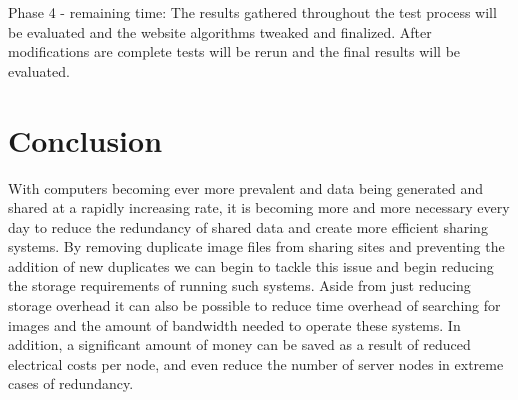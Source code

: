 \documentclass[11pt]{article}
\begin{document}
Phase 4 - remaining time: The results gathered throughout the test process will be evaluated and
the website algorithms tweaked and finalized. After modifications are complete tests will be rerun and the
final results will be evaluated.
\vspace*{-.1in}
\section{Conclusion}
\label{sec:conclusion}
\vspace*{-.1in}


With computers becoming ever more prevalent and data being generated and shared at a rapidly increasing rate, it is becoming more and more necessary every day to reduce the redundancy of shared data and create more efficient sharing systems. By removing duplicate image files from
sharing sites and preventing the addition of new duplicates we can begin to tackle this issue and begin reducing the storage requirements of running such systems. Aside from just reducing storage overhead it can also be possible to reduce time overhead of searching for images and the amount of bandwidth needed to operate these systems. In addition, a significant amount of money can be saved as a result of reduced electrical costs per node, and even reduce the number of server nodes in extreme cases of redundancy.

\newpage


\end{document}
